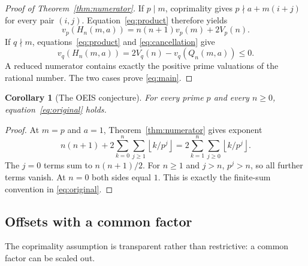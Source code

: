 \documentclass[11pt,a4paper]{article}
\numberwithin{equation}{section}
\newtheorem{corollary}[theorem]{Corollary}
\theoremstyle{definition}
\theoremstyle{remark}
\newcommand{\floor}[1]{\left\lfloor#1\right\rfloor}
\begin{document}
\begin{proof}[Proof of Theorem~\ref{thm:numerator}]
If $p\mid m$, coprimality gives $p\nmid a+m(i+j)$ for every pair $(i,j)$. Equation~\eqref{eq:product} therefore yields
\[
 v_p(H_n(m,a))=n(n+1)v_p(m)+2V_p(n).
\]
If $q\nmid m$, equations~\eqref{eq:product} and \eqref{eq:cancellation} give
\[
 v_q(H_n(m,a))=2V_q(n)-v_q(Q_n(m,a))\leq0.
\]
A reduced numerator contains exactly the positive prime valuations of the rational number. The two cases prove \eqref{eq:main}.
\end{proof}

\begin{corollary}[The OEIS conjecture]\label{cor:oeis}
For every prime $p$ and every $n\geq0$, equation~\eqref{eq:original} holds.
\end{corollary}
\begin{proof}
At $m=p$ and $a=1$, Theorem~\ref{thm:numerator} gives exponent
\[
 n(n+1)+2\sum_{k=0}^n\sum_{j\geq1}\floor{k/p^j}
 =2\sum_{k=1}^n\sum_{j\geq0}\floor{k/p^j}.
\]
The $j=0$ terms sum to $n(n+1)/2$. For $n\geq1$ and $j>n$, $p^j>n$, so all further terms vanish. At $n=0$ both sides equal $1$. This is exactly the finite-sum convention in \eqref{eq:original}.
\end{proof}

\subsection{Offsets with a common factor}
The coprimality assumption is transparent rather than restrictive: a common factor can be scaled out.
\end{document}
